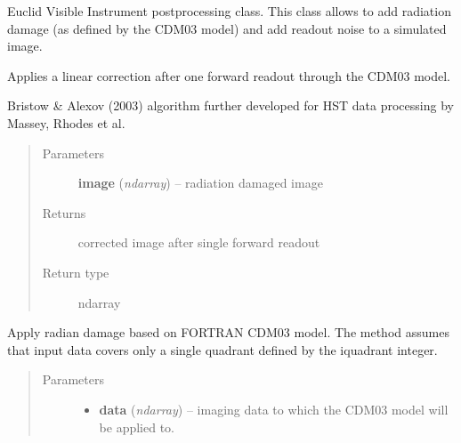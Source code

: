 \documentclass[a4paper,12pt,english]{sphinxmanual}
\begin{document}
\begin{fulllineitems}
\label{postproc:postproc.postprocessing.PostProcessing}
Euclid Visible Instrument postprocessing class. This class allows
to add radiation damage (as defined by the CDM03 model) and add
readout noise to a simulated image.

\begin{fulllineitems}
\label{postproc:postproc.postprocessing.PostProcessing.applyLinearCorrection}
Applies a linear correction after one forward readout through the CDM03 model.

Bristow \& Alexov (2003) algorithm further developed for HST data
processing by Massey, Rhodes et al.
\begin{quote}\begin{description}
\item[{Parameters}] \leavevmode
\textbf{image} (\emph{ndarray}) -- radiation damaged image

\item[{Returns}] \leavevmode
corrected image after single forward readout

\item[{Return type}] \leavevmode
ndarray

\end{description}\end{quote}

\end{fulllineitems}


\begin{fulllineitems}
\label{postproc:postproc.postprocessing.PostProcessing.applyRadiationDamage}
Apply radian damage based on FORTRAN CDM03 model. The method assumes that
input data covers only a single quadrant defined by the iquadrant integer.
\begin{quote}\begin{description}
\item[{Parameters}] \leavevmode\begin{itemize}
\item {} 
\textbf{data} (\emph{ndarray}) -- imaging data to which the CDM03 model will be applied to.


\end{itemize}
\end{description}
\end{quote}
\end{fulllineitems}
\end{fulllineitems}
\end{document}
